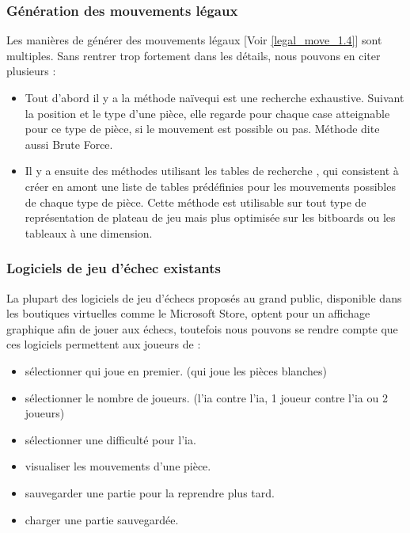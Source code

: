 \documentclass{article}
\begin{document}
\subsubsection{Génération des mouvements légaux}
Les manières de générer des mouvements légaux [Voir \ref{legal_move_1.4}] sont multiples. Sans rentrer trop fortement dans les détails, nous pouvons en citer plusieurs :\newline
\begin{itemize}
    \item Tout d'abord il y a la méthode \guillemotleft naïve\guillemotright  qui est une recherche exhaustive. Suivant la position et le type d'une pièce, elle regarde pour chaque case atteignable pour ce type de pièce, si le mouvement est possible ou pas. Méthode dite aussi Brute Force.\cite{Brute_force}
    \item Il y a ensuite des méthodes utilisant les tables de recherche \cite{Lookup_table}, qui consistent à créer en amont une liste de tables prédéfinies pour les mouvements possibles de chaque type de pièce. Cette méthode est utilisable sur tout type de représentation de plateau de jeu mais plus optimisée sur les bitboards ou les tableaux à une dimension.
\end{itemize}

\subsubsection{Logiciels de jeu d'échec existants}
La plupart des logiciels de jeu d'échecs proposés au grand public, disponible dans les boutiques virtuelles comme le Microsoft Store, optent pour un affichage graphique afin de jouer aux échecs, toutefois nous pouvons se rendre compte que ces logiciels permettent aux joueurs de :

\begin{itemize}
\item sélectionner qui joue en premier. (qui joue les pièces blanches)
\item sélectionner le nombre de joueurs. (l'ia contre l'ia, 1 joueur contre l'ia ou 2 joueurs)
\item sélectionner une difficulté pour l'ia.
\item visualiser les mouvements d'une pièce.
\item sauvegarder une partie pour la reprendre plus tard. 
\item charger une partie sauvegardée.
\newline
\end{itemize}
\end{document}
